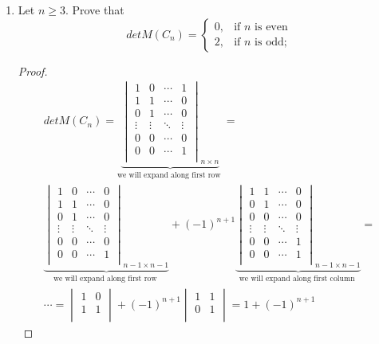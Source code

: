 \documentclass[a4paper, 11pt, oneside]{article}
\newenvironment{problem}[1]
  {\renewcommand\theinnercustomprob{#1}\innercustomprob}
  {\endinnercustomprob}
\begin{document}
\begin{problem}{1.2}
\hfill 
\begin{enumerate}[label=1.2.\arabic*]
\item \label{problem1.2.1} Let $n \geq 3$. Prove that
\begin{equation*}
det M(C_n) = 
	 \begin{cases}
	0, & \text{if $n$ is even}\\
	2, & \text{if $n$ is odd};
	 \end{cases}
\end{equation*}
\begin{proof}
\begin{multline*}
  det M(C_n) = 
  \underbrace {
\begin{vmatrix}
1 & 0 &  \cdots & 1 \\ 
1 & 1 &  \cdots & 0 \\
0 & 1 &  \cdots & 0 \\
\vdots & \vdots & \ddots &\vdots \\
0 & 0 & \cdots & 0 \\ 
0 & 0 & \cdots & 1 \\ 
\end{vmatrix}_{n\times n}
}_\text{we will expand along first row }
= \\
\underbrace {
\begin{vmatrix}
1 & 0 &  \cdots & 0 \\ 
1 & 1 &  \cdots & 0 \\
0 & 1 &  \cdots & 0 \\
\vdots & \vdots & \ddots &\vdots \\
0 & 0 & \cdots & 0 \\ 
0 & 0 & \cdots & 1 \\ 
\end{vmatrix}_{n - 1 \times n - 1}
}_\text{we will expand along first row }
 + (-1)^{n+1}
 \underbrace {
\begin{vmatrix}
1 & 1 &  \cdots & 0 \\ 
0 & 1 &  \cdots & 0 \\
0 & 0 &  \cdots & 0 \\
\vdots & \vdots & \ddots &\vdots \\
0 & 0 & \cdots & 1 \\ 
0 & 0 & \cdots & 1 \\ 
\end{vmatrix}_{n - 1 \times n - 1}
}_\text{we will expand along first column }
= \\ \cdots =
\begin{vmatrix}
1 & 0 \\ 
1 & 1 \\ 
\end{vmatrix}
+ (-1)^{n+1}
\begin{vmatrix}
1 & 1 \\ 
0 & 1 \\ 
\end{vmatrix}
= 1 + (-1)^{n+1} 
\end{multline*}
\end{proof}


\end{enumerate}
\end{problem}
\end{document}
